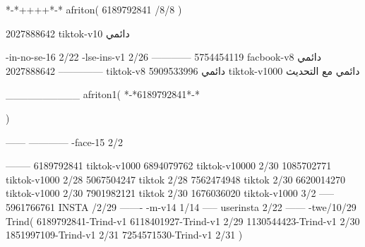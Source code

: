*-*++++*-*
afriton(
6189792841 /8/8
)

2027888642 tiktok-v10
دائمي

-in-no-se-16 2/22
-lse-ins-v1 2/26
------------
5754454119 facbook-v8
دائمي
--------------
2027888642 tiktok-v8
دائمي
5909533996 tiktok-v1000
دائمي مع التحديث

__________
afriton1(
*-*6189792841*-*

)


------
------------
-face-15 2/2

--------
6189792841 tiktok-v1000
6894079762 tiktok-v10000 2/30
1085702771 tiktok-v1000 2/28
5067504247 tiktok 2/28
7562474948 tiktok 2/30
6620014270 tiktok-v1000 2/30
7901982121 tiktok 2/30
1676036020 tiktok-v1000 3/2
-----
5961766761 INSTA /2/29
-------
-m-v14 1/14
-----
userinsta 2/22
------
-twe/10/29
Trind(
6189792841-Trind-v1 
6118401927-Trind-v1 2/29
1130544423-Trind-v1 2/30
1851997109-Trind-v1 2/31
7254571530-Trind-v1 2/31
)
